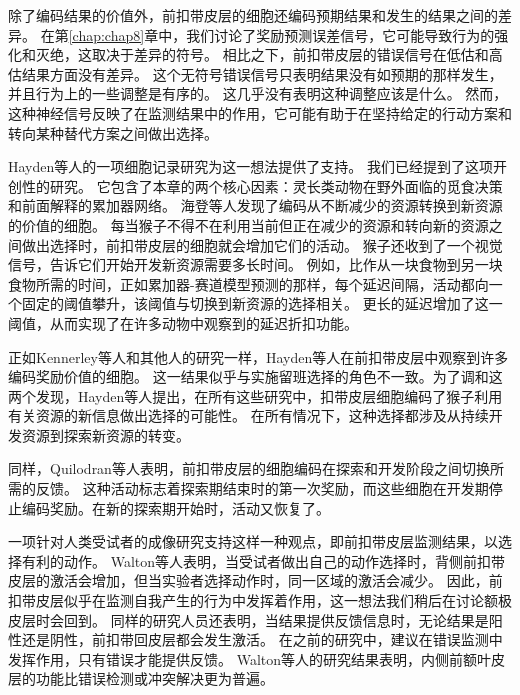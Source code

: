除了编码结果的价值外，前扣带皮层的细胞还编码预期结果和发生的结果之间的差异。
在第\ref{chap:chap8}章中，我们讨论了奖励预测误差信号，它可能导致行为的强化和灭绝，这取决于差异的符号。
相比之下，前扣带皮层的错误信号在低估和高估结果方面没有差异\cite{Hayden et al,2011a}。
这个无符号错误信号只表明结果没有如预期的那样发生，并且行为上的一些调整是有序的。
这几乎没有表明这种调整应该是什么。
然而，这种神经信号反映了在监测结果中的作用，它可能有助于在坚持给定的行动方案和转向某种替代方案之间做出选择。\par


Hayden等人\cite{hayden2011neuronal}的一项细胞记录研究为这一想法提供了支持。
我们已经提到了这项开创性的研究。
它包含了本章的两个核心因素：灵长类动物在野外面临的觅食决策和前面解释的累加器网络。
海登等人发现了编码从不断减少的资源转换到新资源的价值的细胞。
每当猴子不得不在利用当前但正在减少的资源和转向新的资源之间做出选择时，前扣带皮层的细胞就会增加它们的活动。
猴子还收到了一个视觉信号，告诉它们开始开发新资源需要多长时间。
例如，比作从一块食物到另一块食物所需的时间，正如累加器-赛道模型预测的那样，每个延迟间隔，活动都向一个固定的阈值攀升，该阈值与切换到新资源的选择相关。
更长的延迟增加了这一阈值，从而实现了在许多动物中观察到的延迟折扣功能。\par


正如Kennerley等人和其他人的研究一样\cite{matsumoto2003neuronal,seo2007temporal}，Hayden等人在前扣带皮层中观察到许多编码奖励价值的细胞\cite{hayden2009fictive,hayden2010neurons}。
这一结果似乎与实施留班选择的角色不一致。为了调和这两个发现，Hayden等人\cite{hayden2011neuronal}提出，在所有这些研究中，扣带皮层细胞编码了猴子利用有关资源的新信息做出选择的可能性。
在所有情况下，这种选择都涉及从持续开发资源到探索新资源的转变。\par


同样，Quilodran等人\cite{quilodran2008behavioral}表明，前扣带皮层的细胞编码在探索和开发阶段之间切换所需的反馈。
这种活动标志着探索期结束时的第一次奖励，而这些细胞在开发期停止编码奖励。在新的探索期开始时，活动又恢复了。\par


一项针对人类受试者的成像研究支持这样一种观点，即前扣带皮层监测结果，以选择有利的动作。
Walton等人\cite{walton2004interactions}表明，当受试者做出自己的动作选择时，背侧前扣带皮层的激活会增加，但当实验者选择动作时，同一区域的激活会减少。
因此，前扣带皮层似乎在监测自我产生的行为中发挥着作用，这一想法我们稍后在讨论额极皮层时会回到。
同样的研究人员还表明，当结果提供反馈信息时，无论结果是阳性还是阴性，前扣带回皮层都会发生激活。
在之前的研究中，建议在错误监测中发挥作用，只有错误才能提供反馈\cite{yeung2004neural}。
Walton等人的研究结果表明，内侧前额叶皮层的功能比错误检测或冲突解决更为普遍。\par



